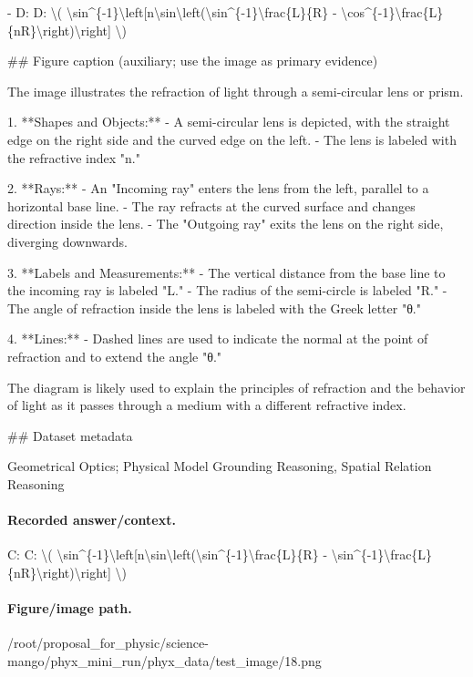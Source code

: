 - D: D: \textbackslash{}( \textbackslash{}sin\textasciicircum{}\{-1\}\textbackslash{}left[n\textbackslash{}sin\textbackslash{}left(\textbackslash{}sin\textasciicircum{}\{-1\}\textbackslash{}frac\{L\}\{R\} - \textbackslash{}cos\textasciicircum{}\{-1\}\textbackslash{}frac\{L\}\{nR\}\textbackslash{}right)\textbackslash{}right] \textbackslash{})

\#\# Figure caption (auxiliary; use the image as primary evidence)

The image illustrates the refraction of light through a semi-circular lens or prism.

1. **Shapes and Objects:**
   - A semi-circular lens is depicted, with the straight edge on the right side and the curved edge on the left.
   - The lens is labeled with the refractive index "n."

2. **Rays:**
   - An "Incoming ray" enters the lens from the left, parallel to a horizontal base line.
   - The ray refracts at the curved surface and changes direction inside the lens.
   - The "Outgoing ray" exits the lens on the right side, diverging downwards.

3. **Labels and Measurements:**
   - The vertical distance from the base line to the incoming ray is labeled "L."
   - The radius of the semi-circle is labeled "R."
   - The angle of refraction inside the lens is labeled with the Greek letter "θ."

4. **Lines:**
   - Dashed lines are used to indicate the normal at the point of refraction and to extend the angle "θ."

The diagram is likely used to explain the principles of refraction and the behavior of light as it passes through a medium with a different refractive index.

\#\# Dataset metadata

Geometrical Optics; Physical Model Grounding Reasoning, Spatial Relation Reasoning

\paragraph{Recorded answer/context.}
C: C: \textbackslash{}( \textbackslash{}sin\textasciicircum{}\{-1\}\textbackslash{}left[n\textbackslash{}sin\textbackslash{}left(\textbackslash{}sin\textasciicircum{}\{-1\}\textbackslash{}frac\{L\}\{R\} - \textbackslash{}sin\textasciicircum{}\{-1\}\textbackslash{}frac\{L\}\{nR\}\textbackslash{}right)\textbackslash{}right] \textbackslash{})

\paragraph{Figure/image path.}
/root/proposal\_for\_physic/science-mango/phyx\_mini\_run/phyx\_data/test\_image/18.png

